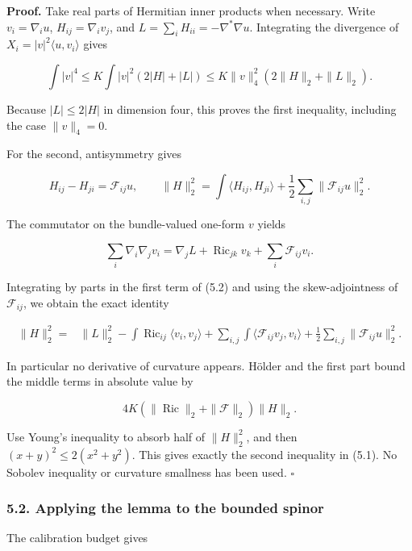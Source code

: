 \documentclass[
  10pt,
]{article}
\begin{document}
\textbf{Proof.} Take real parts of Hermitian inner products when
necessary. Write \(v_i=\nabla_i u\), \(H_{ij}=\nabla_i v_j\), and
\(L=\sum_iH_{ii}=-\nabla^*\nabla u\). Integrating the divergence of
\(X_i=|v|^2\langle u,v_i\rangle\) gives

\[
 \int|v|^4
 \le K\int |v|^2(2|H|+|L|)
 \le K\|v\|_4^2(2\|H\|_2+\|L\|_2).
\]

Because \(|L|\le2|H|\) in dimension four, this proves the first
inequality, including the case \(\|v\|_4=0\).

For the second, antisymmetry gives

\[
 H_{ij}-H_{ji}=\mathscr F_{ij}u,\qquad
 \|H\|_2^2=\int\langle H_{ij},H_{ji}\rangle
                         +\frac12\sum_{i,j}\|\mathscr F_{ij}u\|_2^2.
 \tag{5.2}
\]

The commutator on the bundle-valued one-form \(v\) yields

\[
 \sum_i\nabla_i\nabla_jv_i
     =\nabla_jL+\operatorname{Ric}_{jk}v_k
                                      +\sum_i\mathscr F_{ij}v_i.
\]

Integrating by parts in the first term of (5.2) and using the
skew-adjointness of \(\mathscr F_{ij}\), we obtain the exact identity

\[
 \begin{aligned}
 \|H\|_2^2={}&\|L\|_2^2
  -\int\operatorname{Ric}_{ij}\langle v_i,v_j\rangle
  +\sum_{i,j}\int\langle\mathscr F_{ij}v_j,v_i\rangle
  +\frac12\sum_{i,j}\|\mathscr F_{ij}u\|_2^2.
 \end{aligned}                                              \tag{5.3}
\]

In particular no derivative of curvature appears. Hölder and the first
part bound the middle terms in absolute value by

\[
   4K(\|\operatorname{Ric}\|_2+\|\mathscr F\|_2)\|H\|_2.
\]

Use Young's inequality to absorb half of \(\|H\|_2^2\), and then
\((x+y)^2\le2(x^2+y^2)\). This gives exactly the second inequality in
(5.1). No Sobolev inequality or curvature smallness has been used.
\(\square\)

\hypertarget{applying-the-lemma-to-the-bounded-spinor}{%
\subsubsection{5.2. Applying the lemma to the bounded
spinor}\label{applying-the-lemma-to-the-bounded-spinor}}

The calibration budget gives
\end{document}
